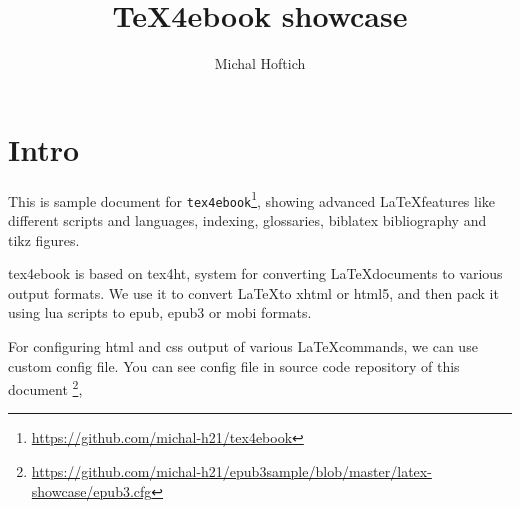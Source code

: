 \documentclass{article}
\begin{document}
	\title{TeX4ebook showcase}
	\author{Michal Hoftich}
	\maketitle
	\tableofcontents
	\section{Intro}

	This is sample document for%
	\verb|tex4ebook|\footnote{\url{https://github.com/michal-h21/tex4ebook}}, 
	showing advanced \LaTeX features like different scripts and languages, 
	indexing, glossaries, biblatex bibliography and tikz figures.
	
	tex4ebook is based on tex4ht, system for converting \LaTeX documents to 
	various output formats. We use it to convert \LaTeX to xhtml or html5, 
	and then pack it using lua scripts to epub, epub3 or mobi formats.

	For configuring html and css output of various \LaTeX commands, 
	we can use custom config file. You can see config file in source code
	repository of this document%
	\footnote{\url{https://github.com/michal-h21/epub3sample/blob/master/latex-showcase/epub3.cfg}},
	
	
	\printglossaries
	\printbibliography
	\printindex
\end{document}
